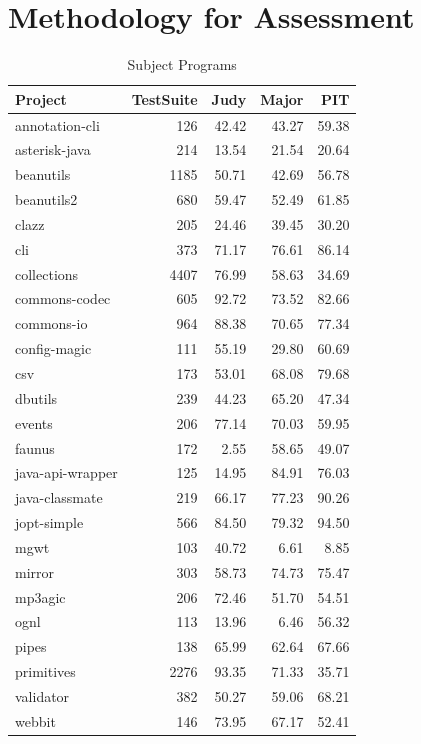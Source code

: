 \documentclass[conference]{IEEEtran}
\begin{document}
\section{Methodology for Assessment}
\label{sec:methodology}
\begin{table}
\centering
\caption{Subject Programs}
{\small
\begin{tabular}{lrrrr}
  \hline
Project & TestSuite & Judy & Major & PIT \\ 
  \hline
annotation-cli & 126 & 42.42 & 43.27 & 59.38 \\ 
  asterisk-java & 214 & 13.54 & 21.54 & 20.64 \\ 
  beanutils & 1185 & 50.71 & 42.69 & 56.78 \\ 
  beanutils2 & 680 & 59.47 & 52.49 & 61.85 \\ 
  clazz & 205 & 24.46 & 39.45 & 30.20 \\ 
  cli & 373 & 71.17 & 76.61 & 86.14 \\ 
  collections & 4407 & 76.99 & 58.63 & 34.69 \\ 
  commons-codec & 605 & 92.72 & 73.52 & 82.66 \\ 
  commons-io & 964 & 88.38 & 70.65 & 77.34 \\ 
  config-magic & 111 & 55.19 & 29.80 & 60.69 \\ 
  csv & 173 & 53.01 & 68.08 & 79.68 \\ 
  dbutils & 239 & 44.23 & 65.20 & 47.34 \\ 
  events & 206 & 77.14 & 70.03 & 59.95 \\ 
  faunus & 172 & 2.55 & 58.65 & 49.07 \\ 
  java-api-wrapper & 125 & 14.95 & 84.91 & 76.03 \\ 
  java-classmate & 219 & 66.17 & 77.23 & 90.26 \\ 
  jopt-simple & 566 & 84.50 & 79.32 & 94.50 \\ 
  mgwt & 103 & 40.72 & 6.61 & 8.85 \\ 
  mirror & 303 & 58.73 & 74.73 & 75.47 \\ 
  mp3agic & 206 & 72.46 & 51.70 & 54.51 \\ 
  ognl & 113 & 13.96 & 6.46 & 56.32 \\ 
  pipes & 138 & 65.99 & 62.64 & 67.66 \\ 
  primitives & 2276 & 93.35 & 71.33 & 35.71 \\ 
  validator & 382 & 50.27 & 59.06 & 68.21 \\ 
  webbit & 146 & 73.95 & 67.17 & 52.41 \\ 
   \hline
\end{tabular}
}


\label{tbl:subjects}
\end{table}
\end{document}
